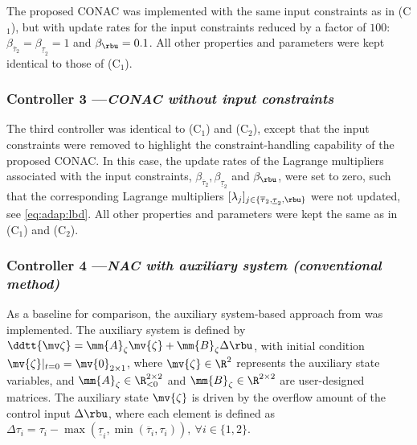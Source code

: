 \documentclass[letterpaper, journal]{IEEEtran}
\begin{document}
The proposed CONAC was implemented with the same input constraints as in (C$_1$), but with update rates for the input constraints reduced by a factor of $100$: $\beta_{\overline{\tau}_2}=\beta_{\underline{\tau}_2}=1$ and $\beta_{\rbu}=0.1$.
All other properties and parameters were kept identical to those of (C$_1$).

\subsubsection*{Controller 3 —\textit{CONAC without input constraints}}

The third controller was identical to (C$_1$) and (C$_2$), except that the input constraints were removed to highlight the constraint-handling capability of the proposed CONAC.
In this case, the update rates of the Lagrange multipliers associated with the input constraints, \ie $\beta_{\overline{\tau}_2},\beta_{\underline{\tau}_2}$ and $\beta_{\rbu}$, were set to zero, such that the corresponding Lagrange multipliers $[\lambda_j]_{j\in\{\overline{\tau}_2,\underline{\tau}_2,\rbu\}}$ were not updated, see \eqref{eq:adap:lbd}.
All other properties and parameters were kept the same as in (C$_1$) and (C$_2$).

\subsubsection*{Controller 4 —\textit{NAC with auxiliary system (conventional method)}}

As a baseline for comparison, the auxiliary system-based approach from \cite{Esfandiari:2014aa, Karason:1994aa, Esfandiari:2015aa} was implemented.
The auxiliary system is defined by $\ddtt{\mv\zeta} = \mm{A}_\zeta \mv{\zeta} + \mm{B}_\zeta \Delta\rbu$, with initial condition $\mv{\zeta}\vert_{t=0} = \mv{0}_{2\times1}$, where $\mv{\zeta}\in\R^2$ represents the auxiliary state variables, and $\mm{A}_\zeta\in\R_{<0}^{2\times 2}$ and $\mm{B}_\zeta\in\R^{2\times 2}$ are user-designed matrices.
The auxiliary state $\mv{\zeta}$ is driven by the overflow amount of the control input $\Delta\rbu$, where each element is defined as $\Delta\tau_{i} = \tau_{i}-\max(\underline\tau_i,\min(\overline\tau_i,\tau_i)),\ \forall i\in\{1,2\}$.
\end{document}
